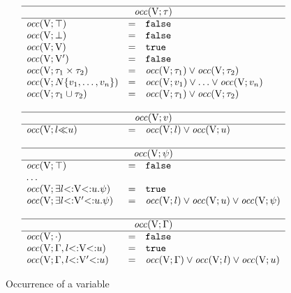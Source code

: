 \begin{figure}
\footnotesize
\[
\begin{array}{lcl}
    \hline
    \multicolumn{3}{c}{\occdflt{\ty}} \\ 
    \hline 
    \occdflt{\tyany} &=& \false\\
    \occdflt{\tybot} &=& \false\\
    \occdflt{\vany}  &=& \true\\
    \occdflt{\vany'}  &=& \false\\
    \occdflt{\typair{\ty_1}{\ty_2}}  &=& \occdflt{\ty_1} \lor \occdflt{\ty_2}\\
    \occdflt{\tyinv\iname{\rexvar_1,\ldots,\rexvar_n}} &=&
        \occdflt{\rexvar_1} \lor \ldots \lor \occdflt{\rexvar_n}\\
    \occdflt{\tyunion{\ty_1}{\ty_2}} &=& \occdflt{\ty_1} \lor \occdflt{\ty_2}\\
    \\
    \hline
    \multicolumn{3}{c}{\occdflt{\rexvar}} \\ 
    \hline 
    \occdflt{\rexvarbound{\tylb}{\tyub}} &=& \occdflt{\tylb} \lor \occdflt{\tyub}\\
    \\
    \hline
    \multicolumn{3}{c}{\occdflt{\tysig}} \\ 
    \hline 
    \occdflt{\tyany} &=& \false\\
    \multicolumn{3}{l}{\ldots} \\
    \occdflt{\tyexist{\vany}{\tylb}{\tyub}{\tysig}} &=& \true\\
    \occdflt{\tyexist{\vany'}{\tylb}{\tyub}{\tysig}} &=& 
        \occdflt{\tylb} \lor \occdflt{\tyub} \lor \occdflt{\tysig}\\
    \\
    \hline
    \multicolumn{3}{c}{\occdflt{\AEnv}} \\ 
    \hline 
    \occdflt{\EmptyEnv} &=& \false \\
    \occdflt{\AEnv, \varbound{\vany}{\tylb}{\tyub}} &=& \true\\
    \occdflt{\AEnv, \varbound{\vany'}{\tylb}{\tyub}} &=& 
        \occdflt{\AEnv} \lor \occdflt{\tylb} \lor \occdflt{\tyub}\\
\end{array}
\]
\caption{Occurrence of a variable}\label{fig:var-occ}
\end{figure}

